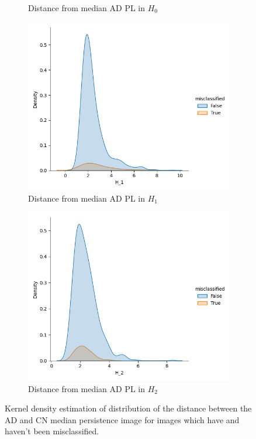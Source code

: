 \documentclass{article}
\begin{document}
\begin{figure}
\begin{subfigure}{0.32\textwidth}
    \caption{Distance from median AD PL in $H_0$}
  \end{subfigure}
  \begin{subfigure}{0.32\textwidth}
    \includegraphics[width=\textwidth]{figures/misclassification_distance/distribution_distance_misclassified_AD_H_1.png}
    \caption{Distance from median AD PL in $H_1$}
  \end{subfigure}
  \begin{subfigure}{0.32\textwidth}
    \includegraphics[width=\textwidth]{figures/misclassification_distance/distribution_distance_misclassified_AD_H_2.png}
    \caption{Distance from median AD PL in $H_2$}
  \end{subfigure}
    \caption{Kernel density estimation of distribution of the distance between the AD and CN median persistence image for images which have and haven't been misclassified.}
  \label{fig:outlier_misclassified}
\end{figure}
\end{document}
